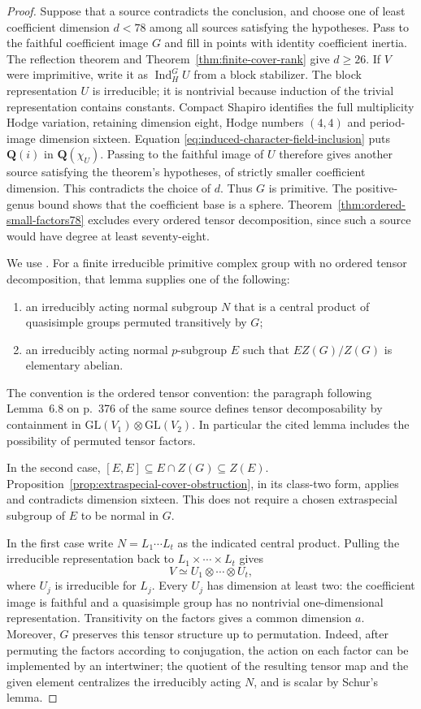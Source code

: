 \documentclass[11pt]{article}
\theoremstyle{definition}
\theoremstyle{remark}
\newcommand{\Q}{\mathbf Q}
\begin{document}
\begin{proof}
Suppose that a source contradicts the conclusion, and choose one
of least coefficient dimension $d<78$ among all sources satisfying
the hypotheses. Pass to the faithful coefficient image $G$ and
fill in points with identity coefficient inertia. The reflection
theorem and Theorem~\ref{thm:finite-cover-rank} give $d\geq26$.
If $V$ were imprimitive, write it as $\operatorname{Ind}_H^G U$
from a block stabilizer. The block representation $U$ is irreducible;
it is nontrivial because induction of the trivial representation
contains constants. Compact Shapiro identifies the full multiplicity
Hodge variation, retaining dimension eight, Hodge numbers $(4,4)$
and period-image dimension sixteen. Equation
\eqref{eq:induced-character-field-inclusion} puts $\Q(i)$ in
$\Q(\chi_U)$. Passing to the faithful image of $U$ therefore
gives another source satisfying the theorem's hypotheses, of
strictly smaller coefficient dimension. This contradicts the
choice of $d$. Thus $G$ is primitive.
The positive-genus bound shows that the coefficient base is a
sphere. Theorem~\ref{thm:ordered-small-factors78} excludes every
ordered tensor decomposition, since such a source would have
degree at least seventy-eight.

We use \cite[Lemma~6.3, p.~375]{ZalesskiEigenvalues}.
For a finite irreducible primitive complex group with no ordered
tensor decomposition, that lemma supplies one of the following:
\begin{enumerate}
 \item an irreducibly acting normal subgroup $N$ that is a
 central product of quasisimple groups permuted transitively
 by $G$;
 \item an irreducibly acting normal $p$-subgroup $E$ such that
 $EZ(G)/Z(G)$ is elementary abelian.
\end{enumerate}
The convention is the ordered tensor convention: the paragraph
following Lemma~6.8 on p.~376 of the same source defines tensor
decomposability by containment in
$\mathrm{GL}(V_1)\otimes\mathrm{GL}(V_2)$.
In particular the cited lemma includes the possibility of
permuted tensor factors.

In the second case,
$[E,E]\subseteq E\cap Z(G)\subseteq Z(E)$.
Proposition~\ref{prop:extraspecial-cover-obstruction}, in its
class-two form, applies and contradicts dimension sixteen.
This does not require a chosen extraspecial subgroup of $E$ to
be normal in $G$.

In the first case write $N=L_1\cdots L_t$ as the indicated
central product.  Pulling the irreducible representation back to
$L_1\times\cdots\times L_t$ gives
\[
 V\simeq U_1\otimes\cdots\otimes U_t,
\]
where $U_j$ is irreducible for $L_j$.  Every $U_j$ has dimension
at least two: the coefficient image is faithful and a quasisimple
group has no nontrivial one-dimensional representation.
Transitivity on the factors gives a common dimension $a$.
Moreover, $G$ preserves this tensor structure up to permutation.
Indeed, after permuting the factors according to conjugation,
the action on each factor can be implemented by an intertwiner;
the quotient of the resulting tensor map and the given element
centralizes the irreducibly acting $N$, and is scalar by Schur's
lemma.


\end{proof}
\end{document}
